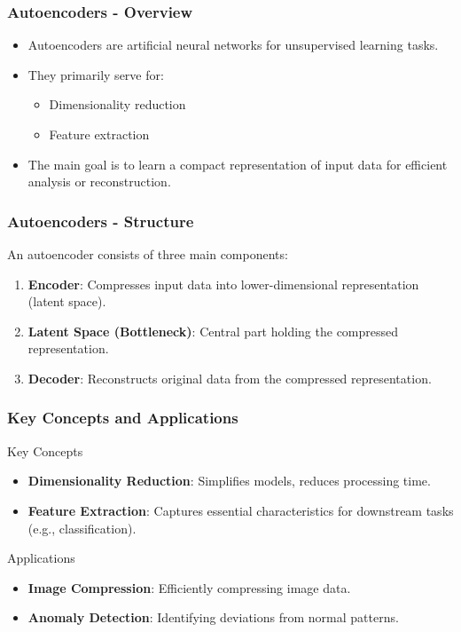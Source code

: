 \documentclass[aspectratio=169]{beamer}
\begin{document}
\begin{frame}[fragile]
    \frametitle{Autoencoders - Overview}
    \begin{itemize}
        \item Autoencoders are artificial neural networks for unsupervised learning tasks.
        \item They primarily serve for:
        \begin{itemize}
            \item Dimensionality reduction
            \item Feature extraction
        \end{itemize}
        \item The main goal is to learn a compact representation of input data for efficient analysis or reconstruction.
    \end{itemize}
\end{frame}

\begin{frame}[fragile]
    \frametitle{Autoencoders - Structure}
    An autoencoder consists of three main components:
    \begin{enumerate}
        \item \textbf{Encoder}: Compresses input data into lower-dimensional representation (latent space).
        \item \textbf{Latent Space (Bottleneck)}: Central part holding the compressed representation.
        \item \textbf{Decoder}: Reconstructs original data from the compressed representation.
    \end{enumerate}
\end{frame}

\begin{frame}[fragile]
    \frametitle{Key Concepts and Applications}
    \begin{block}{Key Concepts}
        \begin{itemize}
            \item \textbf{Dimensionality Reduction}: Simplifies models, reduces processing time.
            \item \textbf{Feature Extraction}: Captures essential characteristics for downstream tasks (e.g., classification).
        \end{itemize}
    \end{block}

    \begin{block}{Applications}
        \begin{itemize}
            \item \textbf{Image Compression}: Efficiently compressing image data.
            \item \textbf{Anomaly Detection}: Identifying deviations from normal patterns.
        \end{itemize}
    \end{block}
\end{frame}
\end{document}
